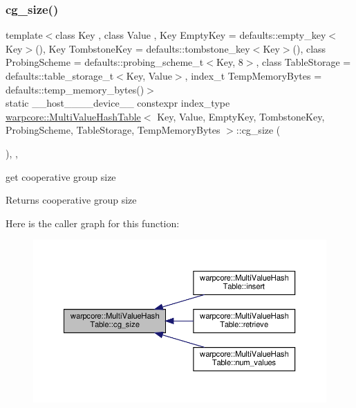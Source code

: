 \subsubsection{\texorpdfstring{cg\+\_\+size()}{cg\_size()}}
{\footnotesize\ttfamily template$<$class Key , class Value , Key Empty\+Key = defaults\+::empty\+\_\+key$<$\+Key$>$(), Key Tombstone\+Key = defaults\+::tombstone\+\_\+key$<$\+Key$>$(), class Probing\+Scheme  = defaults\+::probing\+\_\+scheme\+\_\+t$<$\+Key, 8$>$, class Table\+Storage  = defaults\+::table\+\_\+storage\+\_\+t$<$\+Key, Value$>$, index\+\_\+t Temp\+Memory\+Bytes = defaults\+::temp\+\_\+memory\+\_\+bytes()$>$ \\
static \+\_\+\+\_\+host\+\_\+\+\_\+\+\_\+\+\_\+device\+\_\+\+\_\+ constexpr index\+\_\+type \hyperlink{classwarpcore_1_1MultiValueHashTable}{warpcore\+::\+Multi\+Value\+Hash\+Table}$<$ Key, Value, Empty\+Key, Tombstone\+Key, Probing\+Scheme, Table\+Storage, Temp\+Memory\+Bytes $>$\+::cg\+\_\+size (\begin{DoxyParamCaption}{ }\end{DoxyParamCaption})\hspace{0.3cm}{\ttfamily [inline]}, {\ttfamily [static]}, {\ttfamily [noexcept]}}



get cooperative group size 

\begin{DoxyReturn}{Returns}
cooperative group size 
\end{DoxyReturn}
Here is the caller graph for this function\+:
\nopagebreak
\begin{figure}[H]
\begin{center}
\leavevmode
\includegraphics[width=350pt]{classwarpcore_1_1MultiValueHashTable_ad300c5a01bd933343ff08176fb4b4e29_icgraph}
\end{center}
\end{figure}
\mbox{\label{classwarpcore_1_1MultiValueHashTable_a86fffd9e87b2880ccba285614a6238f3}} 

